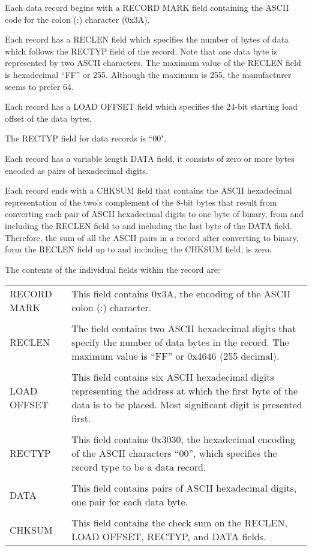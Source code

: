Each data record begins with a RECORD MARK field containing the ASCII code for the colon (:) character (0x3A).

Each record has a RECLEN field which specifies the number of bytes of data which follows the RECTYP field of the record. Note that one data byte is represented by two ASCII characters. The maximum value of the RECLEN field is hexadecimal ``FF'' or 255. Although the maximum is 255, the manufacturer seems to prefer 64.

Each record has a LOAD OFFSET field which specifies the 24-bit starting load offset of the data bytes. 

The RECTYP field for data records is ``00".
 
Each record has a variable length DATA field, it consists of zero or more bytes encoded as pairs of hexadecimal digits. 

Each record ends with a CHKSUM field that contains the ASCII hexadecimal representation of the two's complement of the 8-bit bytes that result from converting each pair of ASCII hexadecimal digits to one byte of binary, from and including the RECLEN field to and including the last byte of the DATA field. Therefore, the sum of all the ASCII pairs in a record after converting to binary, form the RECLEN field up to and including the CHKSUM field, is zero.

The contents of the individual fields within the record are:

\begin{tabular}{l p{10cm}}
RECORD MARK & This field contains 0x3A, the encoding of the ASCII colon (:) character. \\
& \\
RECLEN & The field contains two ASCII hexadecimal digits that specify the number of data bytes in the record. The maximum value is ``FF'' or 0x4646 (255 decimal). \\
& \\
LOAD OFFSET & This field contains six ASCII hexadecimal digits representing the address at which the first byte of the data is to be placed. Most significant digit is presented first.\\
& \\
RECTYP & This field contains 0x3030, the hexadecimal encoding of the ASCII characters ``00'', which specifies the record type to be a data record. \\
& \\
DATA & This field contains pairs of ASCII hexadecimal digits, one pair for each data byte. \\
& \\
CHKSUM & This field contains the check sum on the RECLEN, LOAD OFFSET, RECTYP, and DATA fields. \\
\end{tabular}

